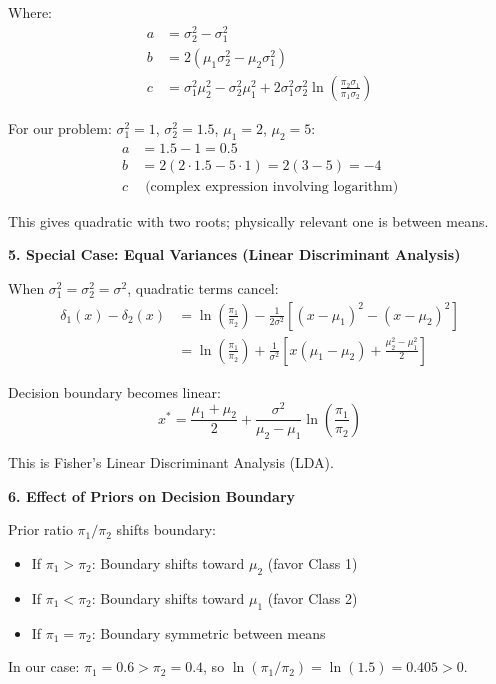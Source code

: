 \documentclass[12pt]{article}
\begin{document}
\begin{explanation}
Where:
\begin{align*}
a &= \sigma_2^2 - \sigma_1^2 \\
b &= 2(\mu_1 \sigma_2^2 - \mu_2 \sigma_1^2) \\
c &= \sigma_1^2 \mu_2^2 - \sigma_2^2 \mu_1^2 + 2\sigma_1^2 \sigma_2^2 \ln\left(\frac{\pi_2 \sigma_1}{\pi_1 \sigma_2}\right)
\end{align*}

For our problem: $\sigma_1^2 = 1$, $\sigma_2^2 = 1.5$, $\mu_1 = 2$, $\mu_2 = 5$:
\begin{align*}
a &= 1.5 - 1 = 0.5 \\
b &= 2(2 \cdot 1.5 - 5 \cdot 1) = 2(3 - 5) = -4 \\
c &\text{ (complex expression involving logarithm)}
\end{align*}

This gives quadratic with two roots; physically relevant one is between means.

\textbf{5. Special Case: Equal Variances (Linear Discriminant Analysis)}

When $\sigma_1^2 = \sigma_2^2 = \sigma^2$, quadratic terms cancel:
\begin{align*}
\delta_1(x) - \delta_2(x) &= \ln\left(\frac{\pi_1}{\pi_2}\right) - \frac{1}{2\sigma^2}[(x-\mu_1)^2 - (x-\mu_2)^2] \\
&= \ln\left(\frac{\pi_1}{\pi_2}\right) + \frac{1}{\sigma^2}[x(\mu_1 - \mu_2) + \frac{\mu_2^2 - \mu_1^2}{2}]
\end{align*}

Decision boundary becomes linear:
\[x^* = \frac{\mu_1 + \mu_2}{2} + \frac{\sigma^2}{\mu_2 - \mu_1} \ln\left(\frac{\pi_1}{\pi_2}\right)\]

This is Fisher's Linear Discriminant Analysis (LDA).

\textbf{6. Effect of Priors on Decision Boundary}

Prior ratio $\pi_1/\pi_2$ shifts boundary:
\begin{itemize}
\item If $\pi_1 > \pi_2$: Boundary shifts toward $\mu_2$ (favor Class 1)
\item If $\pi_1 < \pi_2$: Boundary shifts toward $\mu_1$ (favor Class 2)
\item If $\pi_1 = \pi_2$: Boundary symmetric between means
\end{itemize}

In our case: $\pi_1 = 0.6 > \pi_2 = 0.4$, so $\ln(\pi_1/\pi_2) = \ln(1.5) = 0.405 > 0$.


\end{explanation}
\end{document}
